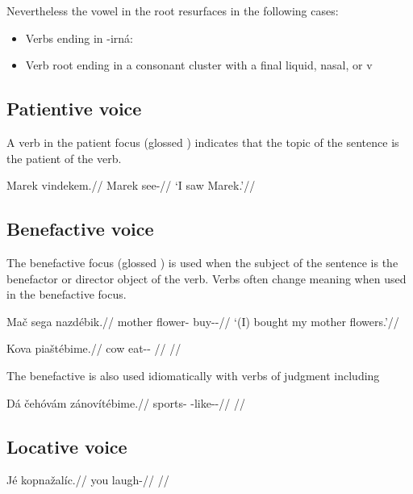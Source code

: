 Nevertheless the vowel  in the root resurfaces in the following cases:

\begin{itemize}
	\item Verbs ending in -irná:
	\item Verb root ending in a consonant cluster with a final liquid, nasal, or v
\end{itemize}

\subsection{Patientive voice}
\par A verb in the patient focus (glossed \Acc{}) indicates that the topic of the sentence is the patient of the verb.

\pex
\begingl
\gla Marek vindekem.//
\glb Marek see-//
\glft `I saw Marek.'//
\endgl
\xe


\subsection{Benefactive voice}
\par The benefactive focus (glossed ) is used when the subject of the sentence is the benefactor or director object of the verb. Verbs often change meaning when used in the benefactive focus.


\begin{multicols}{2}
\pex
\begingl
\gla Mač sega nazdébik.//
\glb mother flower-\Acc{} buy-\Ben{}-\Pf{}//
\glft `(I) bought my mother flowers.'//
\endgl
\xe

\pex
\begingl
\gla Kova piaštébime.//
\glb cow eat-\Ben{}-\Prog{} //
\glft {}//
\endgl
\xe

\end{multicols}

The benefactive is also used idiomatically with verbs of judgment including  

\pex
\begingl
\gla Dá čehóvám zánovítébime.//
\glb \First\Sg{} sports-\Agt{} \Neg{}-like-\Ben{}-\Prog{}//
\glft {}//
\endgl
\xe

\subsection{Locative voice}

\pex
\begingl
\gla Jé kopnažalíc.//
\glb you laugh-//
\glft {}//
\endgl
\xe


